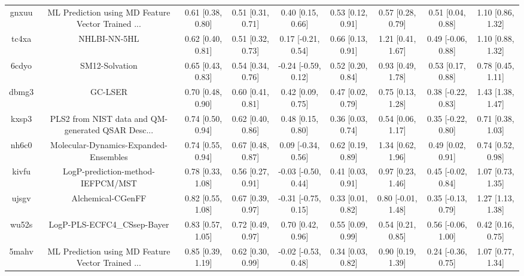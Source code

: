 \documentclass{article}
\begin{document}
\begin{center}
\begin{longtable}{|ccccccccc|}
 gnxuu &  ML Prediction using MD Feature Vector Trained ... &  0.61 [0.38, 0.80] &  0.51 [0.31, 0.71] &     0.40 [0.15, 0.66] &  0.53 [0.12, 0.91] &    0.57 [0.28, 0.79] &    0.51 [0.04, 0.88] &     1.10 [0.86, 1.32] \\
 tc4xa &                                       NHLBI-NN-5HL &  0.62 [0.40, 0.81] &  0.51 [0.32, 0.73] &    0.17 [-0.21, 0.54] &  0.66 [0.13, 0.91] &    1.21 [0.41, 1.67] &   0.49 [-0.06, 0.88] &     1.10 [0.88, 1.32] \\
 6cdyo &                                     SM12-Solvation &  0.65 [0.43, 0.83] &  0.54 [0.34, 0.76] &   -0.24 [-0.59, 0.12] &  0.52 [0.20, 0.84] &    0.93 [0.49, 1.78] &    0.53 [0.17, 0.88] &     0.78 [0.45, 1.11] \\
 dbmg3 &                                            GC-LSER &  0.70 [0.48, 0.90] &  0.60 [0.41, 0.81] &     0.42 [0.09, 0.75] &  0.47 [0.02, 0.79] &    0.75 [0.13, 1.28] &   0.38 [-0.22, 0.83] &     1.43 [1.38, 1.47] \\
 kxsp3 &  PLS2 from NIST data and QM-generated QSAR Desc... &  0.74 [0.50, 0.94] &  0.62 [0.40, 0.86] &     0.48 [0.15, 0.80] &  0.36 [0.03, 0.74] &    0.54 [0.06, 1.17] &   0.35 [-0.22, 0.80] &     0.71 [0.38, 1.03] \\
 nh6c0 &              Molecular-Dynamics-Expanded-Ensembles &  0.74 [0.55, 0.94] &  0.67 [0.48, 0.87] &    0.09 [-0.34, 0.56] &  0.62 [0.19, 0.89] &    1.34 [0.62, 1.96] &    0.49 [0.02, 0.91] &     0.74 [0.52, 0.98] \\
 kivfu &                  LogP-prediction-method-IEFPCM/MST &  0.78 [0.33, 1.08] &  0.56 [0.27, 0.91] &   -0.03 [-0.50, 0.44] &  0.41 [0.03, 0.91] &    0.97 [0.23, 1.46] &   0.45 [-0.02, 0.84] &     1.07 [0.73, 1.35] \\
 ujsgv &                                  Alchemical-CGenFF &  0.82 [0.55, 1.08] &  0.67 [0.39, 0.97] &   -0.31 [-0.75, 0.15] &  0.33 [0.01, 0.82] &   0.80 [-0.01, 1.48] &   0.35 [-0.13, 0.79] &     1.27 [1.13, 1.38] \\
 wu52s &                        LogP-PLS-ECFC4\_CSsep-Bayer &  0.83 [0.57, 1.05] &  0.72 [0.49, 0.97] &     0.70 [0.42, 0.96] &  0.55 [0.09, 0.99] &    0.54 [0.21, 0.85] &   0.56 [-0.06, 1.00] &     0.42 [0.16, 0.75] \\
 5mahv &  ML Prediction using MD Feature Vector Trained ... &  0.85 [0.39, 1.19] &  0.62 [0.30, 0.99] &   -0.02 [-0.53, 0.48] &  0.34 [0.03, 0.82] &    0.90 [0.19, 1.39] &   0.24 [-0.36, 0.75] &     1.07 [0.77, 1.34] \\

\end{longtable}
\end{center}
\end{document}
